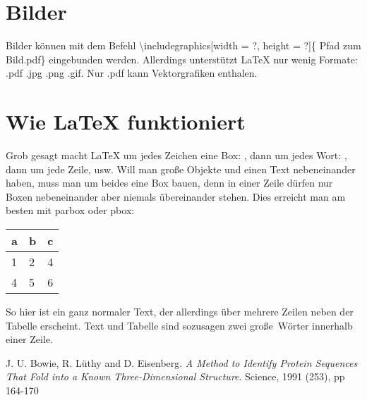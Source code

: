 \section{Bilder}
Bilder können mit dem Befehl \textbackslash includegraphics[width = ?, height = ?]\{ Pfad zum Bild.pdf\} eingebunden werden.		%
Allerdings unterstützt LaTeX nur wenig Formate: .pdf .jpg .png .gif.
Nur .pdf kann Vektorgrafiken enthalen. 		%



\section{Wie LaTeX funktioniert}
Grob gesagt macht \LaTeX{} um jedes Zeichen eine Box: , dann um jedes Wort: , dann um jede Zeile, usw.
Will man große Objekte und einen Text nebeneinander haben, muss man um beides eine Box bauen, denn in einer Zeile dürfen nur Boxen nebeneinander aber niemals übereinander stehen.
Dies erreicht man am besten mit parbox oder pbox:\\
\parbox{3.0cm}{
	\begin{tabular}{l||l|l}
	a & b & c \\ \hline \hline
	1 & 2 & 4 \\
	4 & 5 & 6 \\
	\end{tabular}
}
\parbox{10cm}{So hier ist ein ganz normaler Text, der allerdings über mehrere Zeilen neben der Tabelle erscheint. Text und Tabelle sind sozusagen zwei \glqq große\grqq\ Wörter innerhalb einer Zeile.}



\begin{thebibliography}{------}
	J. U. Bowie, R. L\"uthy and D. Eisenberg.
	{\em A Method to Identify Protein Sequences That Fold
	into a Known Three-Dimensional Structure}.
	Science, 1991 (253), pp 164-170
\end{thebibliography}



